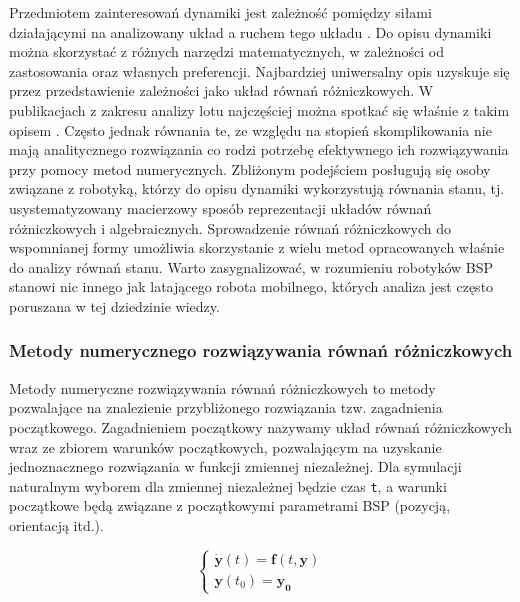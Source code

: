 Przedmiotem zainteresowań dynamiki jest zależność pomiędzy siłami działającymi na analizowany układ a ruchem tego układu \cite{mw}.  Do opisu dynamiki można skorzystać z różnych narzędzi matematycznych, w zależności od zastosowania oraz własnych preferencji. Najbardziej uniwersalny opis uzyskuje się przez przedstawienie zależności jako układ równań różniczkowych. W publikacjach z zakresu analizy lotu najczęściej można spotkać się właśnie z takim opisem \cite{energies}\cite{quaterion}. Często jednak równania te, ze względu na stopień skomplikowania nie mają analitycznego rozwiązania co rodzi potrzebę efektywnego ich rozwiązywania przy pomocy metod numerycznych. Zbliżonym podejściem posługują się osoby związane z robotyką, którzy do opisu dynamiki wykorzystują równania stanu, tj. usystematyzowany macierzowy sposób reprezentacji układów równań różniczkowych i algebraicznych. Sprowadzenie równań różniczkowych do wspomnianej formy umożliwia skorzystanie z wielu metod opracowanych właśnie do analizy równań stanu. Warto zasygnalizować, w rozumieniu robotyków BSP stanowi nic innego jak latającego robota mobilnego, których analiza jest często poruszana w tej dziedzinie wiedzy.

\subsubsection{Metody numerycznego rozwiązywania równań różniczkowych}

Metody numeryczne rozwiązywania równań różniczkowych to metody pozwalające na znalezienie przybliżonego rozwiązania tzw. zagadnienia początkowego. Zagadnieniem początkowy nazywamy układ równań różniczkowych wraz ze zbiorem warunków początkowych, pozwalającym na uzyskanie jednoznacznego rozwiązania w funkcji zmiennej niezależnej. Dla symulacji naturalnym wyborem dla zmiennej niezależnej będzie czas \texttt{t}, a warunki początkowe będą związane z początkowymi parametrami BSP (pozycją, orientacją itd.).

\[
	\begin{cases}
		\dot{\bm{y}} \left( t \right)  = \bm{f} \left( t,\bm{y}\right) \\
		\bm{y} \left( t_0 \right) = \bm{y_0}
	\end{cases}
\]

